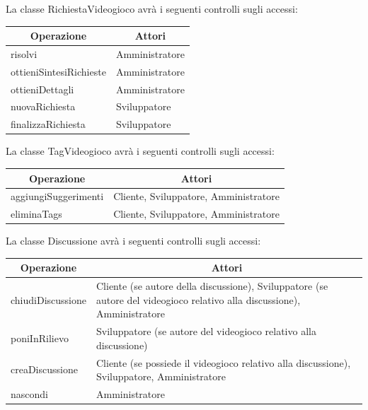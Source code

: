 La classe RichiestaVideogioco avrà i seguenti controlli sugli accessi:
\begin{center}
	\begin{tabular}{||l | p{20.5em}||} 
	\hline
	\multicolumn{1}{||c|}{\textbf{Operazione}} & \multicolumn{1}{c||}{\textbf{Attori}} \\
	\hline\hline
	risolvi & Amministratore \\ 
	\hline
	ottieniSintesiRichieste & Amministratore \\
	\hline
	ottieniDettagli & Amministratore \\
	\hline
	nuovaRichiesta & Sviluppatore \\
	\hline
	finalizzaRichiesta & Sviluppatore \\
	\hline
   \end{tabular}
\end{center}

La classe TagVideogioco avrà i seguenti controlli sugli accessi:
\begin{center}
	\begin{tabular}{||l | p{20.5em}||} 
	\hline
	\multicolumn{1}{||c|}{\textbf{Operazione}} & \multicolumn{1}{c||}{\textbf{Attori}} \\
	\hline\hline
	aggiungiSuggerimenti & Cliente, Sviluppatore, Amministratore \\ 
	\hline
	eliminaTags & Cliente, Sviluppatore, Amministratore \\
	\hline
   \end{tabular}
\end{center}

La classe Discussione avrà i seguenti controlli sugli accessi:
\begin{center}
	\begin{tabular}{||l | p{22em}||} 
	\hline
	\multicolumn{1}{||c|}{\textbf{Operazione}} & \multicolumn{1}{c||}{\textbf{Attori}} \\
	\hline\hline
	chiudiDiscussione & Cliente (se autore della discussione), Sviluppatore (se autore del videogioco relativo alla discussione), Amministratore \\ 
	\hline
	poniInRilievo & Sviluppatore (se autore del videogioco relativo alla discussione) \\
	\hline
	creaDiscussione & Cliente (se possiede il videogioco relativo alla discussione), Sviluppatore, Amministratore \\
	\hline
	nascondi & Amministratore \\
	\hline
   \end{tabular}
\end{center}


